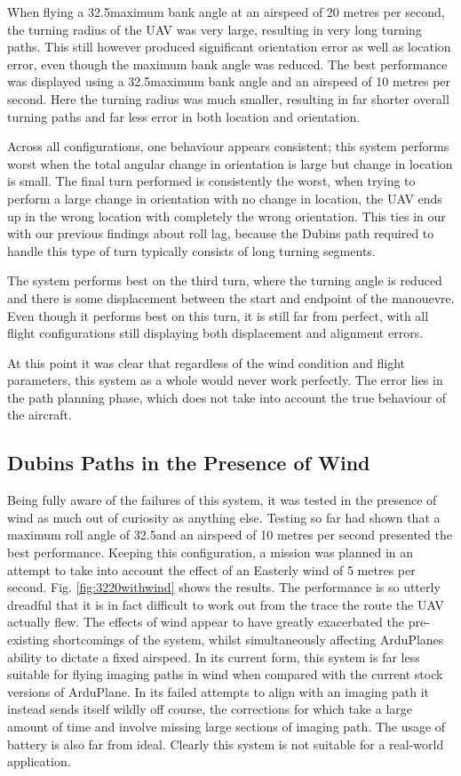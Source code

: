 When flying a 32.5\degree maximum bank angle at an airspeed of 20 metres per second, the turning radius of the UAV was very large, resulting in very long turning paths. This still however produced significant orientation error as well as location error, even though the maximum bank angle was reduced. The best performance was displayed using a 32.5\degree maximum bank angle and an airspeed of 10 metres per second. Here the turning radius was much smaller, resulting in far shorter overall turning paths and far less error in both location and orientation. 

Across all configurations, one behaviour appears consistent; this system performs worst when the total angular change in orientation is large but change in location is small. The final turn performed is consistently the worst, when trying to perform a large change in orientation with no change in location, the UAV ends up in the wrong location with completely the wrong orientation. This ties in our with our previous findings about roll lag, because the Dubins path required to handle this type of turn typically consists of long turning segments. 

The system performs best on the third turn, where the turning angle is reduced and there is some displacement between the start and endpoint of the manouevre. Even though it performs best on this turn, it is still far from perfect, with all flight configurations still displaying both displacement and alignment errors. 

At this point it was clear that regardless of the wind condition and flight parameters, this system as a whole would never work perfectly. The error lies in the path planning phase, which does not take into account the true behaviour of the aircraft. 

\subsection{Dubins Paths in the Presence of Wind}
\label{task2:wind}

Being fully aware of the failures of this system, it was tested in the presence of wind as much out of curiosity as anything else. Testing so far had shown that a maximum roll angle of 32.5\degree and an airspeed of 10 metres per second presented the best performance. Keeping this configuration, a mission was planned in an attempt to take into account the effect of an Easterly wind of 5 metres per second. Fig. \ref{fig:3220withwind} shows the results. The performance is so utterly dreadful that it is in fact difficult to work out from the trace the route the UAV actually flew. The effects of wind appear to have greatly exacerbated the pre-existing shortcomings of the system, whilst simultaneously affecting ArduPlanes ability to dictate a fixed airspeed. In its current form, this system is far less suitable for flying imaging paths in wind when compared with the current stock versions of ArduPlane. In its failed attempts to align with an imaging path it instead sends itself wildly off course, the corrections for which take a large amount of time and involve missing large sections of imaging path. The usage of battery is also far from ideal. Clearly this system is not suitable for a real-world application. 

